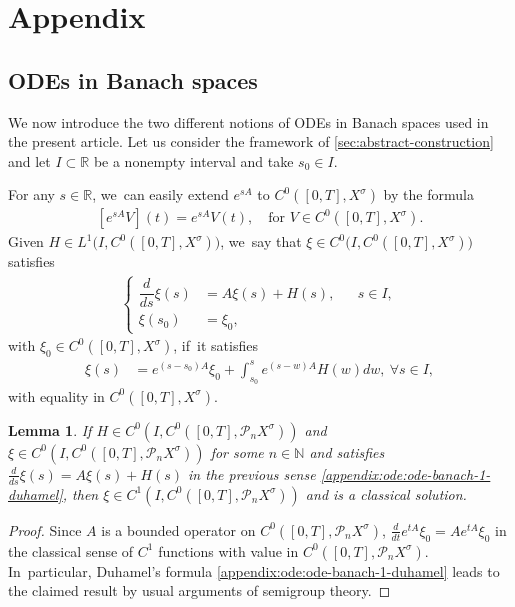 \documentclass[10pt]{amsart}
\newtheorem{lemma}[theorem]{Lemma}
\theoremstyle{definition}
\newcommand{\R}{\mathbb{R}}
\newcommand{\N}{\mathbb{N}}
\renewcommand{\P}{\mathcal{P}}
\begin{document}
\appendix
\setcounter{theorem}{0}
\renewcommand{\thetheorem}{A.\arabic{theorem}}
\renewcommand{\theequation}{A.\arabic{equation}}
\renewcommand{\thesubsection}{A.\arabic{subsection}}

\section*{Appendix}

\subsection{ODEs in Banach spaces} We now introduce the two different notions of ODEs in Banach spaces used in the present article. Let us consider the framework of \cref{sec:abstract-construction} and let $I\subset \R$ be a nonempty interval and take $s_0\in I$.

For any $s\in \R$, we~can easily extend $e^{sA}$ to $C^{0}([0,T],X^{\sigma})$ by the formula
\begin{align*}
\left[e^{sA}V\right](t)=e^{sA}V(t),\quad \text{for $V\in C^{0}([0,T],X^{\sigma})$.}
\end{align*}
Given $H\in L^{1}\big(I,C^{0}([0,T],X^{\sigma})\big)$, we~say that $\xi\in C^{0}\big(I,C^{0}([0,T],X^{\sigma})\big)$ satisfies
\begin{align}\label{appendix:ode:ode-banach-1}
\left\{\begin{aligned}
\dfrac{d}{ds}\xi(s)&=A \xi(s)+H(s), && s\in I, \\
\xi(s_0)&=\xi_0, &&
\end{aligned}\right.
\end{align}
with $\xi_0\in C^{0}([0,T],X^{\sigma})$, if~it satisfies
\begin{align}\label{appendix:ode:ode-banach-1-duhamel}
\xi(s)&=e^{(s-s_0)A}\xi_0+\int_{s_0}^{s}e^{(s-w)A}H(w)dw,\ \forall s\in I,
\end{align}
with equality in $C^{0}([0,T],X^{\sigma})$.
\begin{lemma}
\label{lmDuhamelCauchy}
If $H\in C^0\left(I,C^{0}([0,T],\P_{n}X^{\sigma})\right)$ and $\xi\in C^{0}\left(I,C^{0}([0,T],\P_{n}X^{\sigma})\right)$ for some $n\in\N$ and satisfies
$ \frac{d}{ds}\xi(s)=A \xi(s)+H(s)$ in the previous sense \eqref{appendix:ode:ode-banach-1-duhamel}, then $\xi\in C^{1}\left(I,C^{0}([0,T],\P_{n}X^{\sigma})\right)$ and is a classical solution.
\end{lemma}
\begin{proof}
Since $A$ is a bounded operator on $C^{0}([0,T],\P_{n}X^{\sigma})$, $\frac{d}{dt}e^{tA}\xi_0=A e^{tA}\xi_0$ in the classical sense of $C^1$ functions with value in $C^{0}([0,T],\P_{n}X^{\sigma})$. In~particular, Duhamel's formula \eqref{appendix:ode:ode-banach-1-duhamel} leads to the claimed result by usual arguments of semigroup theory.
\end{proof}
\end{document}
